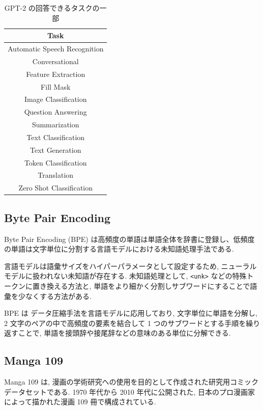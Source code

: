 \documentclass[twocolumn]{jarticle}     %
\begin{document}
\begin{table}[tbh]
  \begin{center}
    \caption{GPT-2 の回答できるタスクの一部}
    \begin{tabular}{c}
      \hline
      Task \\
      \hline
      Automatic Speech Recognition \\
      Conversational \\
      Feature Extraction \\
      Fill Mask \\
      Image Classification \\
      Question Answering \\
      Summarization \\
      Text Classification \\
      Text Generation \\
      Token Classification \\
      Translation \\
      Zero Shot Classification \\
      \hline
    \end{tabular}
    \label{tab:task}
  \end{center}
\end{table}

\subsection{Byte Pair Encoding}
Byte Pair Encoding (BPE) は高頻度の単語は単語全体を辞書に登録し、低頻度の単語は文字単位に分割する言語モデルにおける未知語処理手法である.

言語モデルは語彙サイズをハイパーパラメータとして設定するため, ニューラルモデルに扱われない未知語が存在する.
未知語処理として, \verb|<unk>| などの特殊トークンに置き換える方法と, 単語をより細かく分割しサブワードにすることで語彙を少なくする方法がある.

BPE は
データ圧縮手法を言語モデルに応用しており,
文字単位に単語を分解し, 2 文字のペアの中で高頻度の要素を結合して 1 つのサブワードとする手順を繰り返すことで,
単語を接頭辞や接尾辞などの意味のある単位に分解できる.

\subsection{Manga 109}
Manga 109 \cite{mtap_matsui_2017} は,
漫画の学術研究への使用を目的として作成された研究用コミックデータセットである.
1970 年代から 2010 年代に公開された, 日本のプロ漫画家によって描かれた漫画 109 冊で構成されている.
\end{document}
